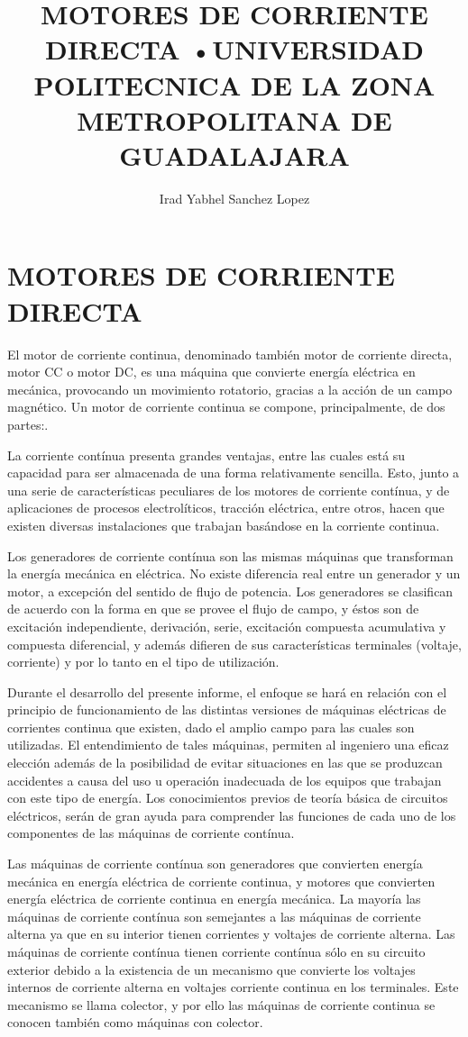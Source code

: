 \documentclass[10pt,a4paper]{article}
\author{Irad Yabhel Sanchez Lopez}
\title{MOTORES DE CORRIENTE DIRECTA }
\begin{document}
\title{•UNIVERSIDAD POLITECNICA DE LA ZONA METROPOLITANA DE GUADALAJARA}


\chapter{MOTORES DE CORRIENTE DIRECTA}


\begin{flushleft}
El motor de corriente continua, denominado también motor de corriente directa, motor CC o motor DC, es una máquina que convierte energía eléctrica en mecánica, provocando un movimiento rotatorio, gracias a la acción de un campo magnético. Un motor de corriente continua se compone, principalmente, de dos partes:.
\n

La corriente contínua presenta grandes ventajas, entre las cuales está su capacidad para ser almacenada de una forma relativamente sencilla. Esto, junto a una serie de características peculiares de los motores de corriente contínua, y de aplicaciones de procesos electrolíticos, tracción eléctrica, entre otros, hacen que existen diversas instalaciones que trabajan basándose en la corriente continua.

Los generadores de corriente contínua son las mismas máquinas que transforman la energía mecánica en eléctrica. No existe diferencia real entre un generador y un motor, a excepción del sentido de flujo de potencia. Los generadores se clasifican de acuerdo con la forma en que se provee el flujo de campo, y éstos son de excitación independiente, derivación, serie, excitación compuesta acumulativa y compuesta diferencial, y además difieren de sus características terminales (voltaje, corriente) y por lo tanto en el tipo de utilización.

Durante el desarrollo del presente informe, el enfoque se hará en relación con el principio de funcionamiento de las distintas versiones de máquinas eléctricas de corrientes continua que existen, dado el amplio campo para las cuales son utilizadas. El entendimiento de tales máquinas, permiten al ingeniero una eficaz elección además de la posibilidad de evitar situaciones en las que se produzcan accidentes a causa del uso u operación inadecuada de los equipos que trabajan con este tipo de energía. Los conocimientos previos de teoría básica de circuitos eléctricos, serán de gran ayuda para comprender las funciones de cada uno de los componentes de las máquinas de corriente contínua.

\n

Las máquinas de corriente contínua son generadores que convierten energía mecánica en energía eléctrica de corriente continua, y motores que convierten energía eléctrica de corriente continua en energía mecánica. La mayoría las máquinas de corriente contínua son semejantes a las máquinas de corriente alterna ya que en su interior tienen corrientes y voltajes de corriente alterna. Las máquinas de corriente contínua tienen corriente contínua sólo en su circuito exterior debido a la existencia de un mecanismo que convierte los voltajes internos de corriente alterna en voltajes corriente continua en los terminales. Este mecanismo se llama colector, y por ello las máquinas de corriente continua se conocen también como máquinas con colector.


\end{flushleft}
\end{document}

